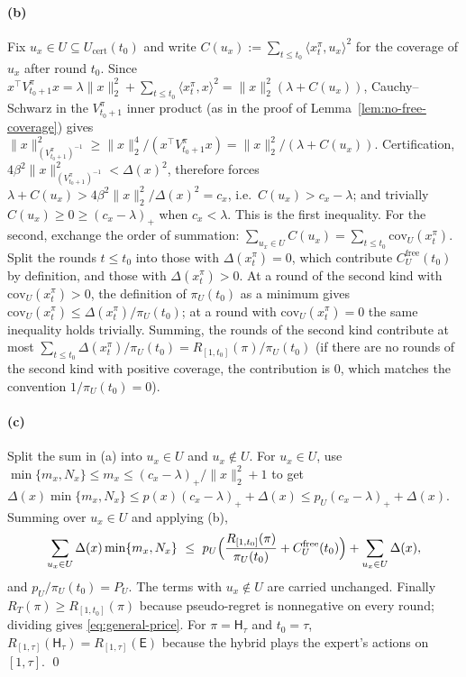 \documentclass{article}
\theoremstyle{definition}
\theoremstyle{remark}
\theoremstyle{remark}
\newcommand{\Exp}{\mathsf{E}}
\newcommand{\Hyb}{\mathsf{H}}
\begin{document}
\paragraph{(b)}
Fix $u_x\in U\subseteq U_{\mathrm{cert}}(t_0)$ and write
$C(u_x):=\sum_{t\le t_0}\langle x^\pi_t,u_x\rangle^2$ for the coverage of
$u_x$ after round $t_0$. Since $x^\top V^\pi_{t_0+1}x=\lambda\|x\|_2^2+\sum_{t\le t_0}\langle x^\pi_t,x\rangle^2=\|x\|_2^2(\lambda+C(u_x))$,
Cauchy--Schwarz in the $V^\pi_{t_0+1}$ inner product (as in the proof of
Lemma~\ref{lem:no-free-coverage}) gives
$\|x\|^2_{(V^\pi_{t_0+1})^{-1}}\ge\|x\|_2^4/(x^\top V^\pi_{t_0+1}x)=\|x\|_2^2/(\lambda+C(u_x))$.
Certification, $4\beta^2\|x\|^2_{(V^\pi_{t_0+1})^{-1}}<\Delta(x)^2$, therefore forces
$\lambda+C(u_x)>4\beta^2\|x\|_2^2/\Delta(x)^2=c_x$, i.e.\ $C(u_x)>c_x-\lambda$;
and trivially $C(u_x)\ge0\ge(c_x-\lambda)_+$ when $c_x<\lambda$. This is the
first inequality. For the second, exchange the order of summation:
$\sum_{u_x\in U}C(u_x)=\sum_{t\le t_0}\mathrm{cov}_U(x^\pi_t)$. Split the
rounds $t\le t_0$ into those with $\Delta(x^\pi_t)=0$, which contribute
$C^{\mathrm{free}}_U(t_0)$ by definition, and those with
$\Delta(x^\pi_t)>0$. At a round of the second kind with
$\mathrm{cov}_U(x^\pi_t)>0$, the definition of $\pi_U(t_0)$ as a
minimum gives $\mathrm{cov}_U(x^\pi_t)\le\Delta(x^\pi_t)/\pi_U(t_0)$;
at a round with $\mathrm{cov}_U(x^\pi_t)=0$ the same inequality holds
trivially. Summing, the rounds of the second kind contribute at most
$\sum_{t\le t_0}\Delta(x^\pi_t)/\pi_U(t_0)=R_{[1,t_0]}(\pi)/\pi_U(t_0)$
(if there are no rounds of the second kind with positive coverage, the
contribution is $0$, which matches the convention $1/\pi_U(t_0)=0$).

\paragraph{(c)}
Split the sum in (a) into $u_x\in U$ and $u_x\notin U$. For $u_x\in U$, use
$\min\{m_x,N_x\}\le m_x\le(c_x-\lambda)_+/\|x\|_2^2+1$ to get
$\Delta(x)\min\{m_x,N_x\}\le p(x)(c_x-\lambda)_++\Delta(x)\le p_U(c_x-\lambda)_++\Delta(x)$.
Summing over $u_x\in U$ and applying (b),
\[
\sum_{u_x\in U}\Delta(x)\min\{m_x,N_x\}\ \le\ p_U\Bigl(\frac{R_{[1,t_0]}(\pi)}{\pi_U(t_0)}+C^{\mathrm{free}}_U(t_0)\Bigr)+\sum_{u_x\in U}\Delta(x),
\]
and $p_U/\pi_U(t_0)=P_U$. The terms with $u_x\notin U$ are carried
unchanged. Finally $R_T(\pi)\ge R_{[1,t_0]}(\pi)$ because pseudo-regret is
nonnegative on every round; dividing gives \eqref{eq:general-price}. For
$\pi=\Hyb_\tau$ and $t_0=\tau$, $R_{[1,\tau]}(\Hyb_\tau)=R_{[1,\tau]}(\Exp)$
because the hybrid plays the expert's actions on $[1,\tau]$.
\qed
\end{document}
